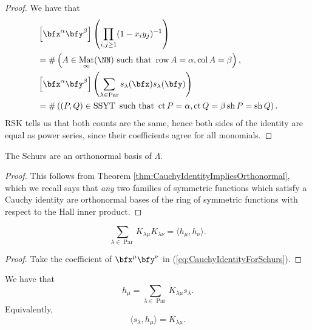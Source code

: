 \documentclass{article}
\DeclareMathOperator{\row}{row}
\DeclareMathOperator{\col}{col}
\DeclareMathOperator{\sh}{sh}
\DeclareMathOperator{\ct}{ct}
\DeclareMathOperator{\Par}{Par}
\DeclareMathOperator{\SSYT}{SSYT}
\DeclareMathOperator{\Mat}{Mat}
\begin{document}
\begin{proof}
    We have that
    \begin{align*}
        &\left[\bfx^\alpha \bfy^\beta\right]
        \left(
            \prod_{i,j\geq1}(1-x_iy_j)^{-1}
        \right)
        \\
        &=
        \#
        \left(
            A \in \Mat_\infty(\NN) \text{ such that } \row A = \alpha, \col A = \beta
        \right), 
        \\
        &\left[\bfx^\alpha \bfy^\beta\right]
        \left(
            \sum_{\lambda\in\Par} 
            s_\lambda(\bfx) s_\lambda(\bfy)
        \right) 
        \\
        &= 
        \#
        \left(
            (P,Q) \in \SSYT \text{ such that } \ct P = \alpha, \ct Q = \beta \sh P = \sh Q
        \right).
    \end{align*}
    RSK tells us that both counts are the same, hence both sides of the identity are equal as power series, since their coefficients agree for all monomials.
\end{proof}

\begin{corollary}
    The Schurs are an orthonormal basis of $\Lambda$.
\end{corollary}

\begin{proof}
    This follows from Theorem \ref{thm:CauchyIdentityImpliesOrthonormal}, which we recall says that \textit{any} two families of symmetric functions which satisfy a Cauchy identity are orthonormal bases of the ring of symmetric functions with respect to the Hall inner product.
\end{proof}

\begin{corollary}
    \[
        \sum_{\lambda \in \Par} K_{\lambda\mu}K_{\lambda\nu} = \langle h_\mu, h_\nu \rangle.
    \]
\end{corollary}

\begin{proof}
    Take the coefficient of $\bfx^\mu \bfy^\nu$ in (\ref{eq:CauchyIdentityForSchurs}).
\end{proof}

\begin{corollary}\label{thm:HToSIsKostka}
    We have that
    \[
        h_\mu = \sum_{\lambda \in \Par} K_{\lambda\mu}s_\lambda.
    \]
    Equivalently,
    \[
        \langle s_\lambda, h_\mu \rangle = K_{\lambda\mu}.
    \]
\end{corollary}
\end{document}

